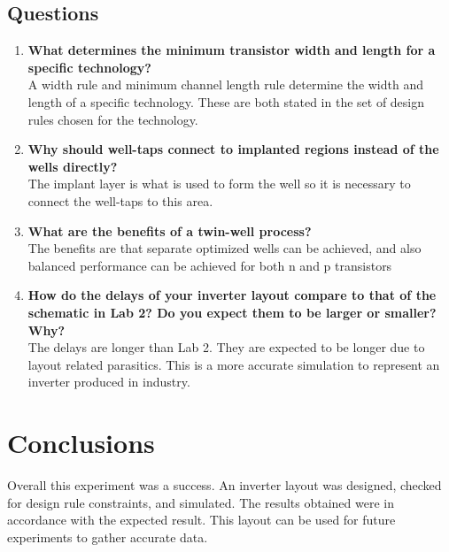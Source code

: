 \documentclass[12pt]{article}
\begin{document}
\subsection{Questions}
\begin{enumerate}
	\item \textbf{What determines the minimum transistor width and length for a specific technology?} \\
	A width rule and minimum channel length rule determine the width and length of a specific technology. These are both stated in the set of design rules chosen for the technology.
	\item \textbf{Why should well-taps connect to implanted regions instead of the wells directly?}\\
	The implant layer is what is used to form the well so it is necessary to connect the well-taps to this area.
	\item \textbf{What are the benefits of a twin-well process?} \\
	The benefits are that separate optimized wells can be achieved, and also balanced performance can be achieved for both n and p transistors
	\item \textbf{How do the delays of your inverter layout compare to that of the schematic in Lab 2? Do you expect them to be larger or smaller? Why?}\\
	The delays are longer than Lab 2. They are expected to be longer due to layout related parasitics. This is a more accurate simulation to represent an inverter produced in industry.
\end{enumerate}
\section{Conclusions}
Overall this experiment was a success. An inverter layout was designed, checked for design rule constraints, and simulated. The results obtained were in accordance with the expected result. This layout can be used for future experiments to gather accurate data.
\end{document}
